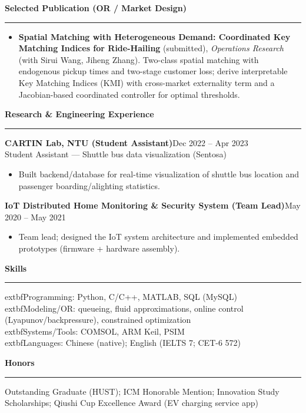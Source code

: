 \documentclass[11pt,a4paper]{article}
\newcommand{\cvsection}[1]{\vspace{2pt}\noindent\textbf{\large #1}\\[-2pt]\textcolor{cvgray}{\rule{\linewidth}{0.4pt}}\vspace{2pt}}
\newcommand{\cvitem}[2]{\textbf{#1}\hfill \textcolor{cvgray}{#2}\\}
\begin{document}
\cvsection{Selected Publication (OR / Market Design)}
\begin{itemize}
  \item \textbf{Spatial Matching with Heterogeneous Demand: Coordinated Key Matching Indices for Ride-Hailing} (submitted), \emph{Operations Research} (with Sirui Wang, Jiheng Zhang). Two-class spatial matching with endogenous pickup times and two-stage customer loss; derive interpretable Key Matching Indices (KMI) with cross-market externality term and a Jacobian-based coordinated controller for optimal thresholds.
\end{itemize}

\cvsection{Research \& Engineering Experience}
\cvitem{CARTIN Lab, NTU (Student Assistant)}{Dec 2022 -- Apr 2023}
Student Assistant --- Shuttle bus data visualization (Sentosa)\\[-3pt]
\begin{itemize}
  \item Built backend/database for real-time visualization of shuttle bus location and passenger boarding/alighting statistics.
\end{itemize}

\cvitem{IoT Distributed Home Monitoring \& Security System (Team Lead)}{May 2020 -- May 2021}
\begin{itemize}
  \item Team lead; designed the IoT system architecture and implemented embedded prototypes (firmware + hardware assembly).
\end{itemize}

\cvsection{Skills}
	extbf{Programming:} Python, C/C++, MATLAB, SQL (MySQL)\\
	extbf{Modeling/OR:} queueing, fluid approximations, online control (Lyapunov/backpressure), constrained optimization\\
	extbf{Systems/Tools:} COMSOL, ARM Keil, PSIM\\
	extbf{Languages:} Chinese (native); English (IELTS 7; CET-6 572)

\cvsection{Honors}
Outstanding Graduate (HUST); ICM Honorable Mention; Innovation \/ Study Scholarships; Qiushi Cup Excellence Award (EV charging service app)
\end{document}
